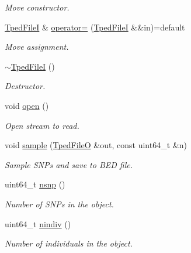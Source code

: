 \begin{DoxyCompactItemize}
\begin{DoxyCompactList}\small\item\em Move constructor. \end{DoxyCompactList}\item 
\mbox{\label{classvarfiles_1_1_tped_file_i_adf0cd58f8ddd49cbd5a0be7362929450}} 
\hyperlink{classvarfiles_1_1_tped_file_i}{Tped\+FileI} \& \hyperlink{classvarfiles_1_1_tped_file_i_adf0cd58f8ddd49cbd5a0be7362929450}{operator=} (\hyperlink{classvarfiles_1_1_tped_file_i}{Tped\+FileI} \&\&in)=default
\begin{DoxyCompactList}\small\item\em Move assignment. \end{DoxyCompactList}\item 
\mbox{\label{classvarfiles_1_1_tped_file_i_a0e78c4f56e48f7a14fbde83988a3ae27}} 
\hyperlink{classvarfiles_1_1_tped_file_i_a0e78c4f56e48f7a14fbde83988a3ae27}{$\sim$\+Tped\+FileI} ()
\begin{DoxyCompactList}\small\item\em Destructor. \end{DoxyCompactList}\item 
\mbox{\label{classvarfiles_1_1_tped_file_i_a8cc477538a243202af5566511dd33074}} 
void \hyperlink{classvarfiles_1_1_tped_file_i_a8cc477538a243202af5566511dd33074}{open} ()
\begin{DoxyCompactList}\small\item\em Open stream to read. \end{DoxyCompactList}\item 
void \hyperlink{classvarfiles_1_1_tped_file_i_afa47ef808ac99f8800d19f2ea0056d2e}{sample} (\hyperlink{classvarfiles_1_1_tped_file_o}{Tped\+FileO} \&out, const uint64\+\_\+t \&n)
\begin{DoxyCompactList}\small\item\em Sample S\+N\+Ps and save to B\+ED file. \end{DoxyCompactList}\item 
\mbox{\label{classvarfiles_1_1_tped_file_i_a1c43c823c70144dce61a3b67dd31e237}} 
uint64\+\_\+t \hyperlink{classvarfiles_1_1_tped_file_i_a1c43c823c70144dce61a3b67dd31e237}{nsnp} ()
\begin{DoxyCompactList}\small\item\em Number of S\+N\+Ps in the object. \end{DoxyCompactList}\item 
\mbox{\label{classvarfiles_1_1_tped_file_i_a1698d01a7a341dda1d5ed2d1e473263f}} 
uint64\+\_\+t \hyperlink{classvarfiles_1_1_tped_file_i_a1698d01a7a341dda1d5ed2d1e473263f}{nindiv} ()
\begin{DoxyCompactList}\small\item\em Number of individuals in the object. \end{DoxyCompactList}\end{DoxyCompactItemize}
